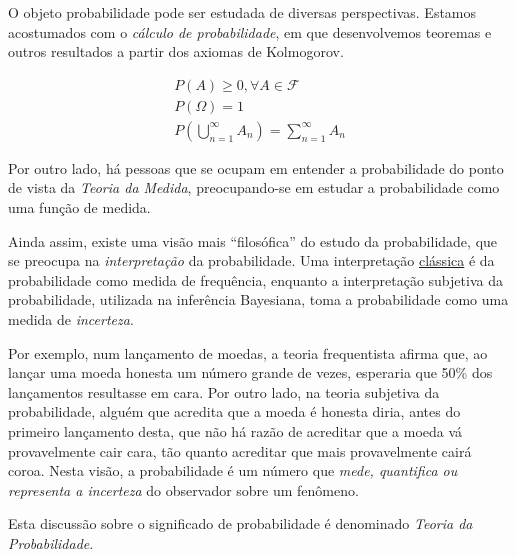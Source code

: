 \documentclass[
  portuguese,
  letterpaper,
  DIV=11,
  numbers=noendperiod]{scrreport}
\begin{document}
\begin{tcolorbox}[enhanced jigsaw, colframe=quarto-callout-note-color-frame, bottomrule=.15mm, toptitle=1mm, left=2mm, toprule=.15mm, bottomtitle=1mm, colback=white, rightrule=.15mm, titlerule=0mm, opacityback=0, coltitle=black, opacitybacktitle=0.6, arc=.35mm, leftrule=.75mm, colbacktitle=quarto-callout-note-color!10!white, breakable, title=\textcolor{quarto-callout-note-color}{\faInfo}\hspace{0.5em}{Probabilidade}]

O objeto probabilidade pode ser estudada de diversas perspectivas.
Estamos acostumados com o \emph{cálculo de probabilidade}, em que
desenvolvemos teoremas e outros resultados a partir dos axiomas de
Kolmogorov.

\[
\begin{aligned}
P(A) \geq 0, \forall A \in \mathcal{F} \\
P(\Omega) = 1 \\
P\left(\bigcup\limits_{n=1}^\infty A_n\right) = \sum^\infty_{n=1} A_n
\end{aligned}
\]

Por outro lado, há pessoas que se ocupam em entender a probabilidade do
ponto de vista da \emph{Teoria da Medida}, preocupando-se em estudar a
probabilidade como uma função de medida.

Ainda assim, existe uma visão mais ``filosófica'' do estudo da
probabilidade, que se preocupa na \emph{interpretação} da probabilidade.
Uma interpretação
\href{https://inferencia-classica.netlify.app}{clássica} é da
probabilidade como medida de frequência, enquanto a interpretação
subjetiva da probabilidade, utilizada na inferência Bayesiana, toma a
probabilidade como uma medida de \emph{incerteza}.

Por exemplo, num lançamento de moedas, a teoria frequentista afirma que,
ao lançar uma moeda honesta um número grande de vezes, esperaria que
50\% dos lançamentos resultasse em cara. Por outro lado, na teoria
subjetiva da probabilidade, alguém que acredita que a moeda é honesta
diria, antes do primeiro lançamento desta, que não há razão de acreditar
que a moeda vá provavelmente cair cara, tão quanto acreditar que mais
provavelmente cairá coroa. Nesta visão, a probabilidade é um número que
\emph{mede, quantifica ou representa a incerteza} do observador sobre um
fenômeno.

Esta discussão sobre o significado de probabilidade é denominado
\emph{Teoria da Probabilidade}.

\end{tcolorbox}
\end{document}
